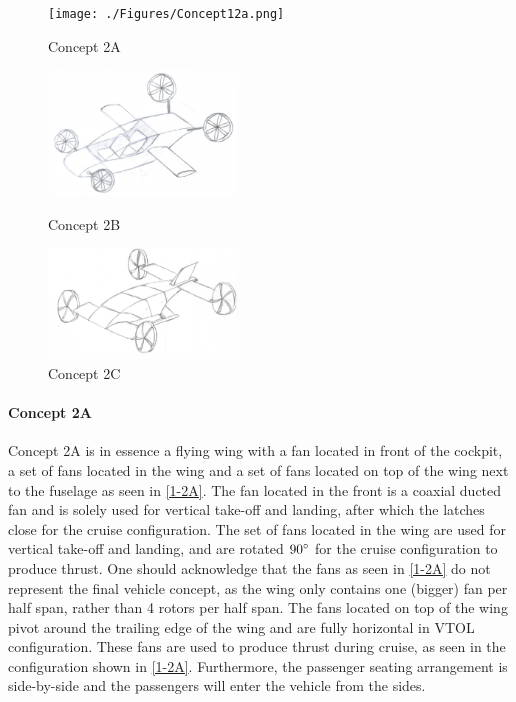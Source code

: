 \begin{figure}[H]
  \centering
  \begin{minipage}[b]{0.25\textwidth}
    \texttt{[image: ./Figures/Concept12a.png]}
    \captionsetup{justification=centering}
    \caption{Concept 2A}
    \label{1-2A}
  \end{minipage}
  \hspace{1.5cm}
  \begin{minipage}[b]{0.30\textwidth}
    \includegraphics[width=5.0cm]{./Figures/Concept12b.PNG}
    \captionsetup{justification=centering}
    \caption{Concept 2B}
    \label{1-2B}
  \end{minipage}
  \hspace{0.5cm}
  \begin{minipage}[b]{0.25\textwidth}
    \includegraphics[width=5.0cm]{./Figures/Concept12c.PNG}
    \captionsetup{justification=centering}
    \caption{Concept 2C}
    \label{1-2C}
  \end{minipage}  
\end{figure}

\paragraph{Concept 2A}
Concept 2A is in essence a flying wing with a fan located in front of the cockpit, a set of fans located in the wing and a set of fans located on top of the wing next to the fuselage as seen in \autoref{1-2A}. The fan located in the front is a coaxial ducted fan and is solely used for vertical take-off and landing, after which the latches close for the cruise configuration. The set of fans located in the wing are used for vertical take-off and landing, and are rotated $90\degree$ for the cruise configuration to produce thrust. One should acknowledge that the fans as seen in \autoref{1-2A} do not represent the final vehicle concept, as the wing only contains one (bigger) fan per half span, rather than 4 rotors per half span. The fans located on top of the wing pivot around the trailing edge of the wing and are fully horizontal in VTOL configuration. These fans are used to produce thrust during cruise, as seen in the configuration shown in \autoref{1-2A}. Furthermore, the passenger seating arrangement is side-by-side and the passengers will enter the vehicle from the sides.

